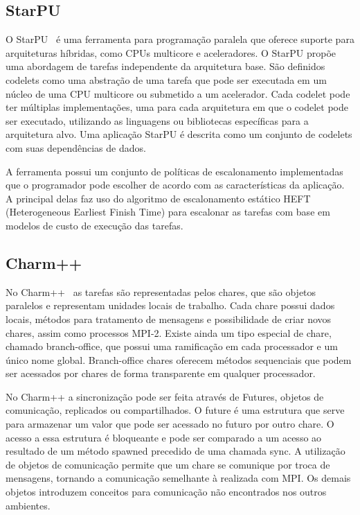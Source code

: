 \subsection{StarPU}
 
O StarPU~\cite{starpu} é uma ferramenta para programação paralela que oferece suporte para arquiteturas híbridas, como CPUs multicore e aceleradores. O StarPU propõe uma abordagem de tarefas independente da arquitetura base. São definidos codelets como uma abstração de uma tarefa que pode ser executada em um núcleo de uma CPU multicore ou submetido a um acelerador. Cada codelet pode ter múltiplas implementações, uma para cada arquitetura em que o codelet pode ser executado, utilizando as linguagens ou bibliotecas específicas para a arquitetura alvo. Uma aplicação StarPU é descrita como um conjunto de codelets com suas dependências de dados.

A ferramenta possui um conjunto de políticas de escalonamento implementadas que o programador pode escolher de acordo com as características da aplicação. A principal delas faz uso do algoritmo de escalonamento estático HEFT (Heterogeneous Earliest Finish Time) para escalonar as tarefas com base em modelos de custo de execução das tarefas.



\subsection{Charm++}

No Charm++~\cite{kunzman2006charm++} as tarefas são representadas pelos chares, que são objetos paralelos e representam unidades locais de trabalho. Cada chare possui dados locais, métodos para tratamento de mensagens e possibilidade de criar novos chares, assim como processos MPI-2. Existe ainda um tipo especial de chare, chamado branch-office, que possui uma ramificação em cada processador e um único nome global. Branch-office chares oferecem métodos sequenciais que podem ser acessados por chares de forma transparente em qualquer processador.

No Charm++ a sincronização pode ser feita através de Futures, objetos de comunicação, replicados ou compartilhados. O future  é uma estrutura que serve para armazenar um valor que pode ser acessado no futuro por outro chare. O acesso a essa estrutura  é bloqueante e pode ser comparado a um acesso ao resultado de um método spawned precedido de uma chamada sync. A utilização de objetos de comunicação permite que um chare se comunique por troca de mensagens, tornando a comunicação semelhante à realizada com MPI. Os demais objetos introduzem conceitos para comunicação não encontrados nos outros ambientes.

